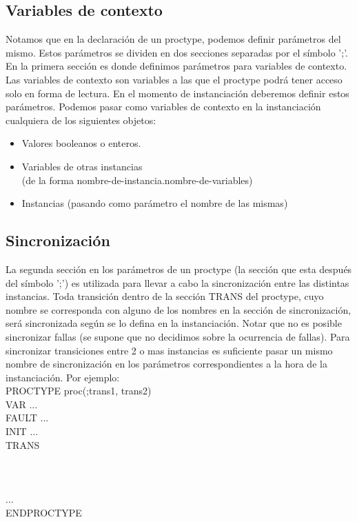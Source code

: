 \documentclass[titlepage, 12pt]{book}
\begin{document}
\subsection{Variables de contexto}
Notamos que en la declaraci\'on de un proctype, podemos definir par\'ametros del mismo. Estos par\'ametros se dividen en dos secciones separadas por el s\'imbolo ';'. En la primera secci\'on es donde definimos par\'ametros para variables de contexto. Las variables de contexto son variables a las que el proctype podr\'a tener acceso solo en forma de lectura. En el momento de instanciaci\'on deberemos definir estos par\'ametros. Podemos pasar como variables de contexto en la instanciaci\'on cualquiera de los siguientes objetos:
\begin{itemize}
\item Valores booleanos o enteros.
\item Variables de otras instancias\\ 
(de la forma nombre-de-instancia.nombre-de-variables)
\item Instancias (pasando como par\'ametro el nombre de las mismas)
\end{itemize}




\subsection{Sincronizaci\'on}
La segunda secci\'on en los par\'ametros de un proctype (la secci\'on que esta despu\'es del s\'imbolo ';') es utilizada para llevar a cabo la sincronizaci\'on entre las distintas instancias. Toda transici\'on dentro de la secci\'on TRANS del proctype, cuyo nombre se corresponda con alguno de los nombres en la secci\'on de sincronizaci\'on, ser\'a sincronizada seg\'un se lo defina en la instanciaci\'on. Notar que no es posible sincronizar fallas (se supone que no decidimos sobre la ocurrencia de fallas).
Para sincronizar transiciones entre 2 o mas instancias es suficiente pasar un mismo nombre de sincronizaci\'on en los par\'ametros correspondientes a la hora de la instanciaci\'on.
Por ejemplo:\\
\newpage
\noindent PROCTYPE proc(;trans1, trans2)\\
\indent	VAR ...\\
\indent	FAULT ...\\
\indent	INIT ...\\
\indent	TRANS\\
\indent\indent		[trans1]\\
\indent\indent		[trans2]\\
\indent\indent		[trans2]\\
\indent\indent		...\\
ENDPROCTYPE\\
\end{document}
